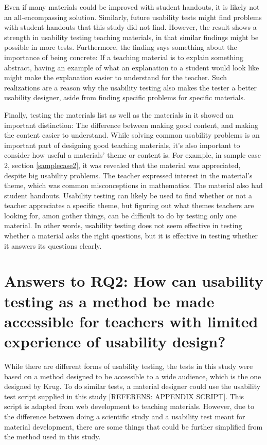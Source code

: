Even if many materials could be improved with student handouts, it is likely not an all-encompassing solution. Similarly, future usability tests might find problems with student handouts that this study did not find. However, the result shows a strength in usability testing teaching materials, in that similar findings might be possible in more tests. Furthermore, the finding says something about the importance of being concrete: If a teaching material is to explain something abstract, having an example of what an explanation to a student would look like might make the explanation easier to understand for the teacher. Such realizations are a reason why the usability testing also makes the tester a better usability designer, aside from finding specific problems for specific materials.

Finally, testing the materials list as well as the materials in it showed an important distinction: The difference between making good content, and making the content easier to understand. While solving common usability problems is an important part of designing good teaching materials, it's also important to consider how useful a materials' theme or content is. For example, in sample case 2, section \ref{samplecase2}, it was revealed that the material was appreciated, despite big usability problems. The teacher expressed interest in the material's theme, which was common misconceptions in mathematics. The material also had student handouts. Usability testing can likely be used to find whether or not a teacher appreciates a specific theme, but figuring out what themes teachers are looking for, amon gother things, can be difficult to do by testing only one material. In other words, usability testing does not seem effective in testing whether a material asks the right questions, but it is effective in testing whether it answers its questions clearly.

\section{Answers to RQ2: How can usability testing as a method be made accessible for teachers with limited experience of usability design?}

While there are different forms of usability testing, the tests in this study were based on a method designed to be accessible to a wide audience, which is the one designed by Krug. To do similar tests, a material designer could use the usability test script supplied in this study [REFERENS: APPENDIX SCRIPT]. This script is adapted from web development to teaching materials. However, due to the difference between doing a scientific study and a usability test meant for material development, there are some things that could be further simplified from the method used in this study.

